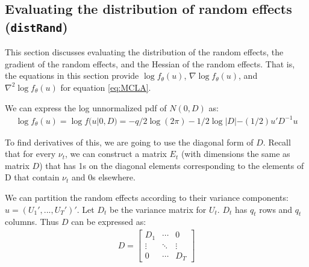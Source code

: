 \documentclass{article}
\begin{document}
%
%



\subsection{Evaluating the distribution of random effects (\texttt{distRand})}\label{sec:distRand}
This section discusses evaluating the distribution of the random effects, the gradient of the random effects, and the Hessian of the random effects. That is, the equations in this section provide  $\log f_\theta(u)$, $\nabla \log f_\theta(u)$, and $\nabla^2 \log f_\theta(u)$  for equation \ref{eq:MCLA}.

 We can  express the log unnormalized pdf of $N(0, D)$  as:
\begin{align}
\log f_\theta(u)= \log f (u| 0, D) = - q/2 \log (2 \pi) -1/2 \log |D| - (1/2) u' D^{-1} u
\end{align}

 To find derivatives of this, we are going to use the diagonal form of $D$. Recall that for every $\nu_t$, we can construct a matrix $E_t$ (with dimensions the same as matrix $D$) that has 1s on the diagonal elements corresponding to the elements of D that contain $\nu_t$ and 0s  elsewhere.  

We can partition the random effects according to their variance components: $u=(U_1',...,U_T')'$.  Let $D_t$ be the variance matrix for $U_t$. $D_t$ has $q_t$ rows  and $q_t$ columns. Thus $D$ can be expressed as:
\begin{align}
D = \begin{bmatrix} D_1 & \cdots & 0 \\ \vdots & \ddots & \vdots \\ 0 & \cdots & D_T \end{bmatrix}
\end{align}
\end{document}
